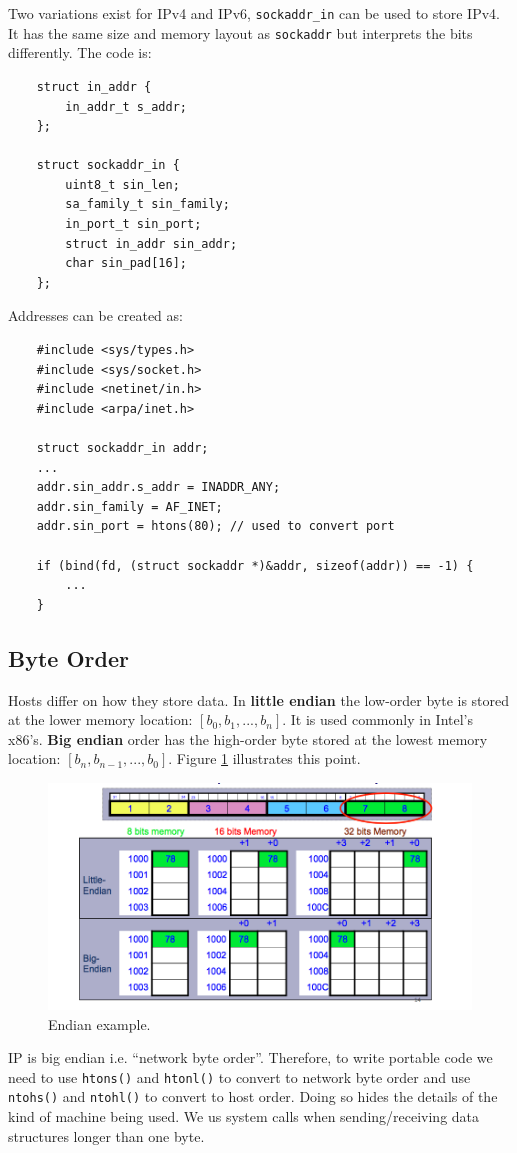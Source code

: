 \documentclass[twoside]{article}
\begin{document}
Two variations exist for IPv4 and IPv6, \texttt{sockaddr\_in} can be used to 
store IPv4. It has the same size and memory layout as \texttt{sockaddr} but 
interprets the bits differently. The code is:
\begin{lstlisting}
    struct in_addr {
        in_addr_t s_addr;
    };

    struct sockaddr_in {
        uint8_t sin_len;
        sa_family_t sin_family;
        in_port_t sin_port;
        struct in_addr sin_addr;
        char sin_pad[16];
    };
\end{lstlisting}
Addresses can be created as:
\begin{lstlisting}
    #include <sys/types.h>
    #include <sys/socket.h>
    #include <netinet/in.h>
    #include <arpa/inet.h>

    struct sockaddr_in addr;
    ...
    addr.sin_addr.s_addr = INADDR_ANY;
    addr.sin_family = AF_INET;
    addr.sin_port = htons(80); // used to convert port

    if (bind(fd, (struct sockaddr *)&addr, sizeof(addr)) == -1) {
        ...
    }
\end{lstlisting}
\subsection{Byte Order}
Hosts differ on how they store data. In \textbf{little endian} the low-order
byte is stored at the lower memory location: \([b_0, b_1,...,b_n]\). It is 
used commonly in Intel's x86's. \textbf{Big endian} order has the high-order
byte stored at the lowest memory location: \([b_n, b_{n-1},...,b_0]\). Figure 
\ref{fig:endian} illustrates this point.
\begin{figure}
  \includegraphics[width=\linewidth]{endian.png}
  \caption{Endian example.}
  \label{fig:endian}
\end{figure}
IP is big endian i.e. ``network byte order''. Therefore, to write portable code
we need to use \texttt{htons()} and \texttt{htonl()} to convert to network
byte order and use \texttt{ntohs()} and \texttt{ntohl()} to convert to host 
order. Doing so hides the details of the kind of machine being used. We us
system calls when sending/receiving data structures longer than one byte.
\end{document}
